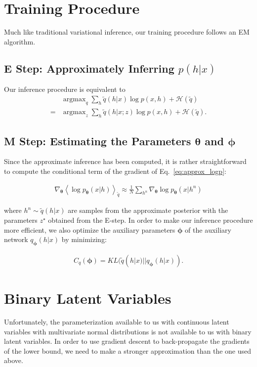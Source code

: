 \documentclass[preprint, twocolumn]{article}
\newcommand{\qexp}[1]{\left<#1\right>}
\newcommand{\vects}[1]{\boldsymbol{#1}}
\newcommand{\TT}[0]{\vects{\theta}}
\newcommand{\PP}[0]{\vects{\phi}}
\newcommand{\HH}[0]{\mathcal{H}}
\DeclareMathOperator*{\argmax}{\arg \max}
\begin{document}
\section{Training Procedure}
Much like traditional variational inference, our training procedure follows an EM algorithm.

\subsection{E Step: Approximately Inferring $p(h|x)$}
Our inference procedure is equivalent to 
\begin{align*}
    &\argmax_{q}  \sum_h \tilde{q}(h|x) \log p(x,h) + \HH(\tilde{q}) \\
    =& \argmax_{z} \sum_h \tilde{q}(h|x; z) \log p(x,h) + \HH(\tilde{q}).
\end{align*}

\subsection{M Step: Estimating the Parameters $\TT$ and $\PP$}

Since the approximate inference has been computed, it is rather straightforward
to compute the conditional term of the gradient of Eq.~\eqref{eq:approx_logp}:

\begin{align*}
    \nabla_{\TT} \qexp{\log p_{\TT}(x|h)}_{\tilde{q}} \approx \frac{1}{N} \sum_{h^n} \nabla_{\TT} \log p_{\TT}(x|h^n)
\end{align*}

where $h^n \sim \tilde{q}(h|x)$ are samples from the approximate posterior with the parameters $z^{\star}$ obtained from the E-step. In order to make our inference procedure more efficient, we also optimize the auxiliary parameters $\PP$ of the auxiliary network $q_{\PP}(h|x)$ by minimizing:

\begin{align}
    \label{eq:c_q}
    C_q(\PP) = KL(\tilde{q}(h|x)||q_{\PP}(h|x)).
\end{align}

\section{Binary Latent Variables}
Unfortunately, the parameterization available to us with continuous latent variables with multivariate normal distributions is not available to us with binary latent variables. In order to use gradient descent to back-propagate the gradients of the lower bound, we need to make a stronger approximation than the one used above. 
\end{document}
